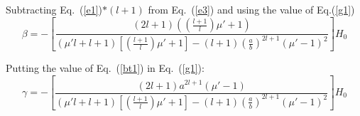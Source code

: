 Subtracting Eq.~(\ref{e1})$*(l+1)$ from Eq.~(\ref{e3}) and using the value of Eq.(\ref{g1})
\begin{equation}\label{bt1}
\beta=-\left[\frac{(2l+1)\left(\left(\frac{l+1}{l}\right)\mu'+1\right)}{(\mu'l+l+1)\left[\left(\frac{l+1}{l}\right)\mu'+1\right]-(l+1)\left(\frac{a}{b}\right)^{2l+1}(\mu'-1)^2}\right]H_0
\end{equation}



Putting the value of Eq.~(\ref{bt1}) in Eq.~(\ref{g1}):
\begin{equation}\label{g2}
\gamma=-\left[\frac{(2l+1)a^{2l+1}(\mu'-1)}{(\mu'l+l+1)\left[\left(\frac{l+1}{l}\right)\mu'+1\right]-(l+1)\left(\frac{a}{b}\right)^{2l+1}(\mu'-1)^2}\right] H_0    
\end{equation}


